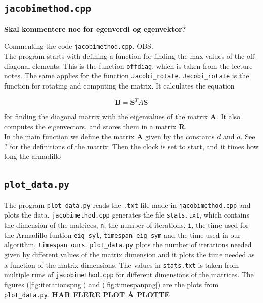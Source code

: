 \documentclass{article}
\begin{document}

\subsection{\texttt{jacobimethod.cpp}}

\textbf{Skal kommentere noe for egenverdi og egenvektor?}

Commenting the code \texttt{jacobimethod.cpp}.  OBS. \\

The program starts with defining a function for finding the max values of the off-diagonal elements. This is the function \texttt{offdiag}, which is taken from the lecture notes. The same applies for the function \texttt{Jacobi\_rotate}. \texttt{Jacobi\_rotate} is the function for rotating and computing the matrix. It calculates the equation

\begin{equation*}
    \textbf{B} = \textbf{S}^T A \textbf{S}
\end{equation*}

for finding the diagonal matrix with the eigenvalues of the matrix \textbf{A}. It also computes the eigenvectors, and stores them in a matrix \textbf{R}. \\

In the main function we define the matrix \textbf{A} given by the constants $d$ and $a$. See ? for the definitions of the matrix. Then the clock is set to start, and it times how long the armadillo \\



\subsection{\texttt{plot\_data.py}}

The program \texttt{plot\_data.py} reads the \texttt{.txt}-file made in \texttt{jacobimethod.cpp} and plots the data. \texttt{jacobimethod.cpp} generates the file \texttt{stats.txt}, which contains the dimension of the matrices, \texttt{n}, the number of iterations, \texttt{i}, the time used for the Armadillo-funtion \texttt{eig\_syl}, \texttt{timespan eig\_sym} and the time used in our algorithm, \texttt{timespan ours}.
\texttt{plot\_data.py} plots the number of iterations needed given by different values of the matrix dimension and it plots the time needed as a function of the matrix dimensions. The values in \texttt{stats.txt} is taken from multiple runs of \texttt{jacobimethod.cpp} for different dimensions of the matrices. The figures (\ref{fig:iterationspng}) and (\ref{fig:timespanpng}) are the plots from \texttt{plot\_data.py}. \textbf{HAR FLERE PLOT Å PLOTTE} \\
\end{document}
